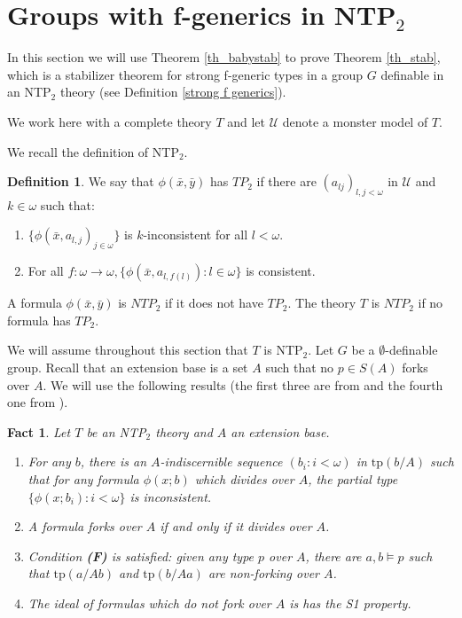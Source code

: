 \documentclass[12pt]{article}
\newtheorem{fact}[thm]{Fact}
\theoremstyle{definition}
\newtheorem{defi}[thm]{Definition}
\theoremstyle{mystyle}
\theoremstyle{remark}
\newcommand{\ntp}{NTP$_2$ }
\newcommand{\tp}{\mathrm{tp}}
\begin{document}
\section{Groups with f-generics in \ntp}\label{SGroups}

In this section we will use Theorem \ref{th_babystab} to prove Theorem \ref{th_stab}, which
is a stabilizer theorem for strong f-generic types in a group $G$
definable in an \ntp
 theory (see Definition \ref{strong f generics}).

 We work here with a complete theory $T$ and let $\mathcal U$ denote a monster model of $T$.

 We recall the definition of NTP$_2$.

\begin{defi}\label{NTP2}
We say that  $\phi(\bar{x}, \bar{y})$ has $TP_2$ if there are $(a_{l j})_{l, j < \omega}$ in $\mathcal U$ and $k \in \omega$ such that:
\begin{enumerate}
    \item $\{\phi(\bar{x}, a_{l, j})_{j \in \omega}\}$ is $k$-inconsistent for all $l< \omega .$
    \item For all $f:\omega \rightarrow \omega, \{\phi(\bar{x}, a_{l, f(l)}): l \in \omega\}$ is consistent.
\end{enumerate}
 A formula $\phi(\bar{x}, \bar{y})$ is \emph{$NTP_2$}  if it does not have $TP_2$.
The theory $T$ is \emph{$NTP_2$} if no formula has $TP_2$.

\end{defi}

We will assume throughout this section that $T$ is NTP$_2$. Let $G$ be a $\emptyset$-definable group.
Recall that an extension base is a set $A$ such that no $p\in S(A)$ forks over $A$.
We will use the following results (the first three are from
\cite{ChKa} and the fourth one from \cite{BYC}).

\begin{fact}\label{fact_ntp}
Let $T$ be an NTP$_2$ theory and $A$ an extension base.

\begin{enumerate}
\item For any $b$, there is an $A$-indiscernible sequence
$(b_i:i<\omega)$ in $\tp (b/A)$ such that for any formula
$\phi(x;b)$ which divides over $A$, the partial type
$\{\phi(x;b_i):i<\omega\}$ is inconsistent.

\item A formula forks over $A$ if and only if it divides over $A$.

\item Condition \textbf{(F)} is satisfied: given any type $p$ over $A$, there are $a,b\models p$ such that $\tp(a/Ab)$ and $\tp(b/Aa)$ are non-forking over $A$.

\item The ideal of formulas which do not fork over $A$ is has the S1 property.

\end{enumerate}
\end{fact}
\end{document}

